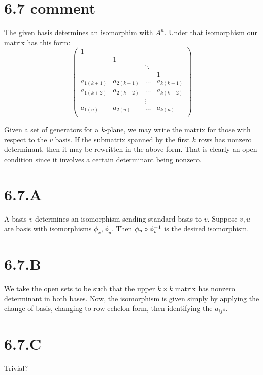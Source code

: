 \documentclass{article}
\begin{document}
\section{6.7 comment}
The given basis determines an isomorphim with $A^n$. Under
that isomorphism our matrix has this form: \[
    \begin{pmatrix}
        1          &            &        &            \\
                   & 1          &        &            \\
                   &            & \ddots &            \\
                   &            &        & 1          \\
        a_{1(k+1)} & a_{2(k+1)} & \dots  & a_{k(k+1)} \\
        a_{1(k+2)} & a_{2(k+2)} & \dots  & a_{k(k+2)} \\
                   &            & \vdots &            \\
        a_{1(n)}   & a_{2(n)}   & \dots  & a_{k(n)}   \\
    \end{pmatrix}
\]

Given a set of generators for a $k$-plane, we may write the
matrix for those with respect to the $v$ basis. If the
submatrix spanned by the first $k$ rows has nonzero
determinant, then it may be rewritten in the above form. That is clearly an
open condition since it involves a certain determinant being nonzero.

\section{6.7.A}
A basis $v$ determines an isomorphism sending standard
basis to $v$. Suppose $v, u$ are basis
with isomorphisms $\phi_v, \phi_u$. Then $\phi_u \circ \phi^{-1}_v$ is the
desired isomorphism.

\section{6.7.B}
We take the open sets to be such that the upper $k\times k$ matrix
has nonzero determinant in both bases. Now, the isomorphism is given simply by
applying the change of basis, changing to row echelon form, then identifying
the $a_{ij}$s.

\section{6.7.C}
Trivial?
\end{document}
